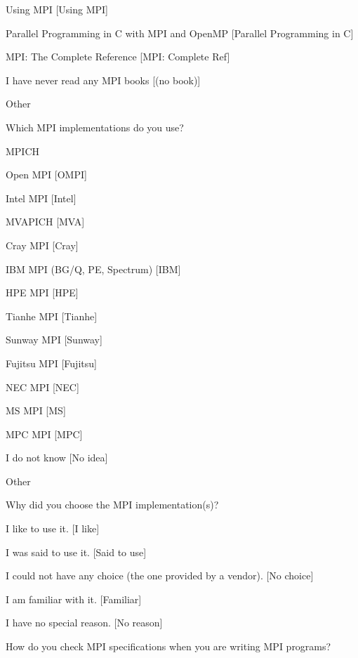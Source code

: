 \documentclass[preprint,5p,times]{elsarticle}
\begin{document}
{{\begin{description}
\begin{inparaenum}[{\bf C}1)]
    \item Using MPI [Using MPI]
    \item Parallel Programming in C with MPI and OpenMP [Parallel
      Programming in C]
    \item MPI: The Complete Reference [MPI: Complete Ref]
    \item I have never read any MPI books [(no book)]
    \item Other
    \end{inparaenum}
  \item[Q12*:] Which MPI implementations do you use?
    \begin{inparaenum}[{\bf C}1)]
    \item MPICH
    \item Open MPI [OMPI]
    \item Intel MPI [Intel]
    \item MVAPICH [MVA]
    \item Cray MPI [Cray]
    \item IBM MPI (BG/Q, PE, Spectrum) [IBM]
    \item HPE MPI [HPE]
    \item Tianhe MPI [Tianhe]
    \item Sunway MPI [Sunway]
    \item Fujitsu MPI [Fujitsu]
    \item NEC MPI [NEC]
    \item MS MPI [MS]
    \item MPC MPI [MPC]
    \item I do not know [No idea]
    \item Other
    \end{inparaenum}
  \item[Q13:] Why did you choose the MPI implementation(s)?
    \begin{inparaenum}[{\bf C}1)]
    \item I like to use it. [I like]
    \item I was said to use it. [Said to use]
    \item I could not have any choice (the one provided by a vendor). [No choice]
    \item I am familiar with it. [Familiar]
    \item I have no special reason. [No reason]
    \end{inparaenum}
  \item[Q14*:] How do you check MPI specifications when you are writing MPI programs?
    \begin{inparaenum}[{\bf C}1)]

\end{inparaenum}
\end{description}}}
\end{document}
